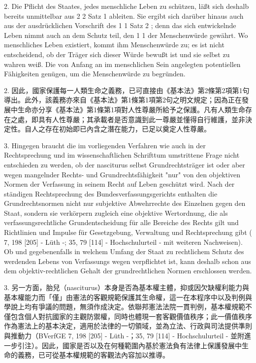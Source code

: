 \documentclass[12pt]{article}
\begin{document}
\syncleft
\begin{sourcepara}
2. Die Pflicht des Staates, jedes menschliche Leben zu schützen, läßt sich deshalb bereits unmittelbar aus \abbrArt{} 2 \abbrAbs{} 2 Satz 1 \abbrGG{}\ggfnArtTwoTwoOneDE{} ableiten. Sie ergibt sich darüber hinaus auch aus der ausdrücklichen Vorschrift des \abbrArt{} 1 \abbrAbs{} 1 Satz 2 \abbrGG{}\ggfnArtOneOneTwoDE{}; denn das sich entwickelnde Leben nimmt auch an dem Schutz teil, den \abbrArt{} 1 \abbrAbs{} 1 \abbrGG{} der Menschenwürde gewährt. Wo menschliches Leben existiert, kommt ihm Menschenwürde zu; es ist nicht entscheidend, ob der Träger sich dieser Würde bewußt ist und sie selbst zu wahren weiß. Die von Anfang an im menschlichen Sein angelegten potentiellen Fähigkeiten genügen, um die Menschenwürde zu begründen.
\end{sourcepara}
\begin{transpara}
2. 因此，國家保護每一人類生命之義務，已可直接由《基本法》第2條第2項第1句\ggfnArtTwoTwoOneZH{}導出。此外，該義務亦來自《基本法》第1條第1項第2句之明文規定；因為正在發展中生命亦分享《基本法》第1條第1項對人性尊嚴所給予之保護。凡有人類生命存在之處，即具有人性尊嚴；其承載者是否意識到此一尊嚴並懂得自行維護，並非決定性。自人之存在初始即已內含之潛在能力，已足以奠定人性尊嚴。
\end{transpara}

\syncleft
\begin{sourcepara}
3. Hingegen braucht die im vorliegenden Verfahren wie auch in der Rechtsprechung und im wissenschaftlichen Schrifttum umstrittene Frage nicht entschieden zu werden, ob der nasciturus selbst Grundrechtsträger ist oder aber wegen mangelnder Rechts- und Grundrechtsfähigkeit "nur" von den objektiven Normen der Verfassung in seinem Recht auf Leben geschützt wird. Nach der ständigen Rechtsprechung des Bundesverfassungsgerichts enthalten die Grundrechtsnormen nicht nur subjektive Abwehrrechte des Einzelnen gegen den Staat, sondern sie verkörpern zugleich eine objektive Wertordnung, die als verfassungsrechtliche Grundentscheidung für alle Bereiche des Rechts gilt und Richtlinien und Impulse für Gesetzgebung, Verwaltung und Rechtsprechung gibt (\abbrBVerfGE{} 7, 198 [205] - Lüth -; 35, 79 [114] - Hochschulurteil - mit weiteren Nachweisen). Ob und gegebenenfalls in welchem Umfang der Staat zu rechtlichem Schutz des werdenden Lebens von Verfassungs wegen verpflichtet ist, kann deshalb schon aus dem objektiv-rechtlichen Gehalt der grundrechtlichen Normen erschlossen werden.
\end{sourcepara}
\begin{transpara}
3. 另一方面，胎兒（nasciturus）本身是否為基本權主體，抑或因欠缺權利能力與基本權能力而「僅」由憲法的客觀規範保護其生命權，這一在本程序中以及判例與學說上均有爭議的問題，無須作成決定。依聯邦憲法法院一貫判例，基本權規範不僅包含個人對抗國家的主觀防禦權，同時也體現一套客觀價值秩序；此一價值秩序作為憲法上的基本決定，適用於法律的一切領域，並為立法、行政與司法提供準則與推動力（BVerfGE 7, 198 [205] - Lüth -；35, 79 [114] - Hochschulurteil - 並附進一步引注）。因此，國家是否以及在何種範圍內基於憲法負有法律上保護發展中生命的義務，已可從基本權規範的客觀法內容加以推導。
\end{transpara}
\end{document}
